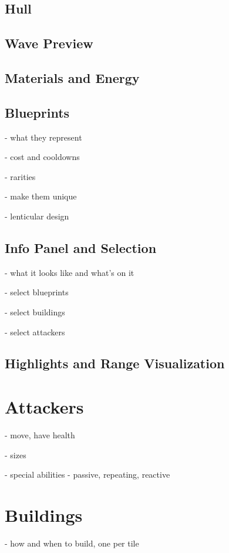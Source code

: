 \subsection{Hull}

\subsection{Wave Preview}

\subsection{Materials and Energy}

\subsection{Blueprints}

- what they represent

- cost and cooldowns

- rarities

- make them unique

- lenticular design

\subsection{Info Panel and Selection}

- what it looks like and what's on it

- select blueprints

- select buildings

- select attackers

\subsection{Highlights and Range Visualization}

\section{Attackers}

- move, have health

- sizes

- special abilities - passive, repeating, reactive

\section{Buildings}

- how and when to build, one per tile

